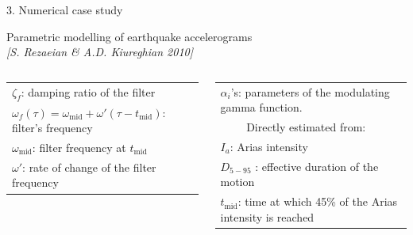 \documentclass[10pt,xcolor = dvipsnames]{beamer}
\newcommand{\vc}[1]{\vspace*{#1cm}}
\newcommand{\Blue}{\color{blue}}
\begin{document}
\begin{frame}[t]{3. Numerical case study}
\vc{-0.3}\begin{block}{\small Parametric modelling of earthquake accelerograms\\  \scriptsize \em [S. Rezaeian \& A.D. Kiureghian 2010]}


\begin{figure}[t!]
\end{figure}


\begin{columns}
\scriptsize \begin{tabular}{l} 
{\Blue $\zeta_f$}: damping ratio of the filter \\
{\Blue $\omega_f(\tau) = \omega_{\text{mid}} + \omega'(\tau-t_{\text{mid}})$}: filter's frequency\\
{\Blue $\omega_{\text{mid}}$}: filter frequency at $t_{\text{mid}}$\\
{\Blue $\omega'$}: rate of change of the filter frequency\\
\end{tabular}


\scriptsize
\scriptsize \begin{tabular}{l} 
{\Blue $\alpha_i$'s}: parameters of the modulating gamma function.  \\ $\qquad$ Directly estimated from:\\
{\Blue $I_a$}: Arias intensity\\
{\Blue $D_{5-95}$ }: effective duration of the motion \\
{\Blue $t_{\text{mid}}$}: time at which 45\% of the Arias intensity is reached\\
\end{tabular}
\end{columns}

\end{block}

\end{frame}
\end{document}
